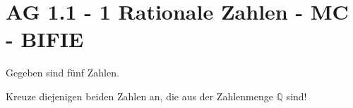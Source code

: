 \section{AG 1.1 - 1 Rationale Zahlen - MC - BIFIE}

\begin{beispiel}{1} %
				Gegeben sind fünf Zahlen.
				
				Kreuze diejenigen beiden Zahlen an, die aus der Zahlenmenge $\mathbb{Q}$ sind!
\end{beispiel}
